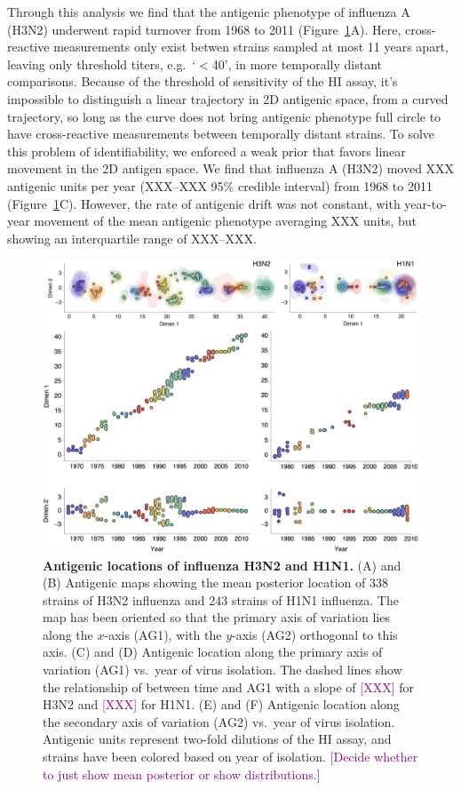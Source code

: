 \documentclass[11pt,oneside,letterpaper]{article}
\def\tbc#1{\textcolor{purple}{[#1]}}
\begin{document}
Through this analysis we find that the antigenic phenotype of influenza A (H3N2) underwent rapid turnover from 1968 to 2011 (Figure~\ref{fluAGrid}A).  
Here, cross-reactive measurements only exist betwen strains sampled at most 11 years apart, leaving only threshold titers, e.g.\ `$<$40', in more temporally distant comparisons.  
Because of the threshold of sensitivity of the HI assay, it's impossible to distinguish a linear trajectory in 2D antigenic space, from a curved trajectory, so long as the curve does not bring antigenic phenotype full circle to have cross-reactive measurements between temporally distant strains.
To solve this problem of identifiability, we enforced a weak prior that favors linear movement in the 2D antigen space.
We find that influenza A (H3N2) moved XXX antigenic units per year (XXX--XXX 95\% credible interval) from 1968 to 2011 (Figure~\ref{fluAGrid}C).
However, the rate of antigenic drift was not constant, with year-to-year movement of the mean antigenic phenotype averaging XXX units, but showing an interquartile range of XXX--XXX.


\begin{figure}[tb]
	\centering		
	\includegraphics[width=\textwidth]{figures/fluAGrid}
	\caption{\textbf{Antigenic locations of influenza H3N2 and H1N1.} (A) and (B) Antigenic maps showing the mean posterior location of 338 strains of H3N2 influenza and 243 strains of H1N1 influenza.  
	The map has been oriented so that the primary axis of variation lies along the $x$-axis (AG1), with the $y$-axis (AG2) orthogonal to this axis.  
	(C) and (D) Antigenic location along the primary axis of variation (AG1) vs.\ year of virus isolation.  
	The dashed lines show the relationship of between time and AG1 with a slope of \tbc{XXX} for H3N2 and \tbc{XXX} for H1N1.  
	(E) and (F) Antigenic location along the secondary axis of variation (AG2) vs.\ year of virus isolation.  
	Antigenic units represent two-fold dilutions of the HI assay, and strains have been colored based on year of isolation.  
	\tbc{Decide whether to just show mean posterior or show distributions.}
	} 
	\label{fluAGrid} 
\end{figure}
\end{document}
